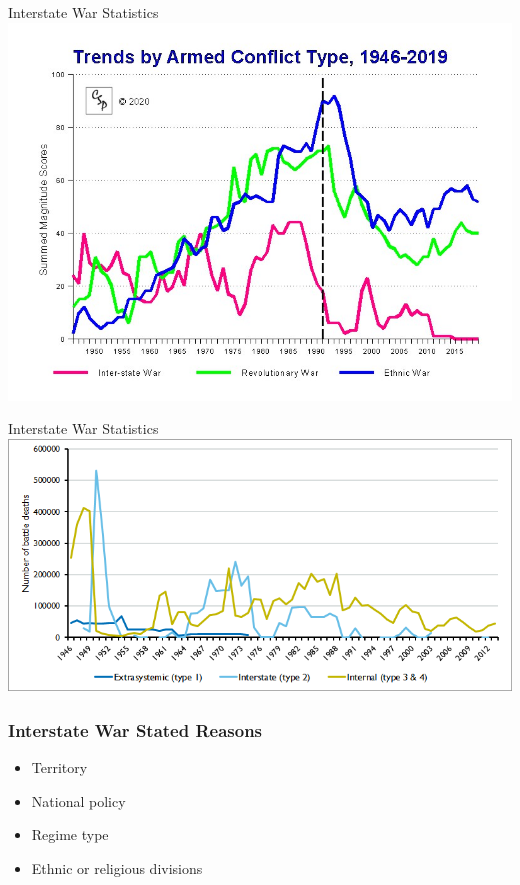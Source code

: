 \documentclass{beamer}
\begin{document}
\begin{frame}{\LARGE Interstate War Statistics} %
	\centering
	\includegraphics[width=\textwidth,height=0.9\textheight,keepaspectratio]{wartyp19.jpg}
\end{frame}

\begin{frame}{\LARGE Interstate War Statistics} %
	\centering
	\includegraphics[width=\textwidth]{battledeathnumbers.png}
\end{frame}

\begin{frame} 
	\frametitle{\LARGE{Interstate War Stated Reasons}}
	\begin{itemize}
		\item Territory \pause
		\item National policy \pause
		\item Regime type \pause
		\item Ethnic or religious divisions 		
	\end{itemize}
\end{frame}
\end{document}
